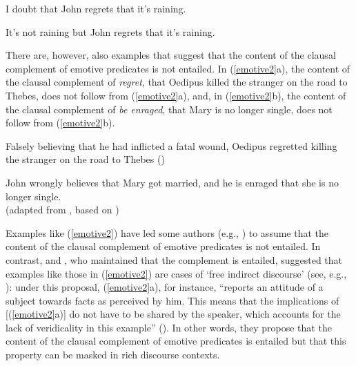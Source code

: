 \documentclass[11pt,fleqn]{article}
\def\infelic{{\leavevmode\llap{\#}}}
\newcommand{\6}{\mbox{$[\hspace*{-.6mm}[$}}
\newcommand{\9}{\mbox{$]\hspace*{-.6mm}]$}}
\begin{document}
\begin{exe}

\ex\label{emotive1} \citealt[514]{abrusan2011}

\begin{xlist}

\ex I doubt that John regrets that it's raining.

\ex \infelic It's not raining but John regrets that it's raining. 

\end{xlist}

\end{exe}

There are, however, also examples that suggest that the content of the clausal complement of emotive predicates is not entailed. In (\ref{emotive2}a), the content of the clausal complement of {\em regret}, that Oedipus killed the stranger on the road to Thebes, does not follow from (\ref{emotive2}a), and, in (\ref{emotive2}b), the content of the clausal complement of {\em be enraged}, that Mary is no longer single, does not follow from (\ref{emotive2}b). 

\begin{exe}

\ex\label{emotive2}

\begin{xlist}

\ex Falsely believing that he had inflicted a fatal wound, Oedipus regretted killing the stranger on the road to Thebes \hfill (\citealt{klein1975})

\ex John wrongly believes that Mary got married, and he is enraged that she is no longer single. \\ \hspace*{.2cm} \hfill (adapted from \citealt{egre2008}, based on \citealt{schlenker03})

\end{xlist}

\end{exe}
Examples like (\ref{emotive2}) have led some authors (e.g., \citealt{klein1975,giannakidou1998,schlenker2003,egre2008}) to assume that the content of the clausal complement of emotive predicates is not entailed. In contrast, \citet{gazdar79a} and \citet{abrusan2011}, who maintained that the complement is entailed, suggested that examples like those in (\ref{emotive2}) are cases of `free indirect discourse' (see, e.g., \citealt{eckardt2014}):  under this proposal, (\ref{emotive2}a), for instance, ``reports an attitude of a subject towards facts as perceived by him. This means that the implications of [(\ref{emotive2}a)] do not have to be shared by the speaker, which accounts for the lack of veridicality in this example'' (\citealt[514]{abrusan2011}). In other words, they propose that the content of the clausal complement of emotive predicates is entailed but that this property can be masked in rich discourse contexts.
\end{document}
